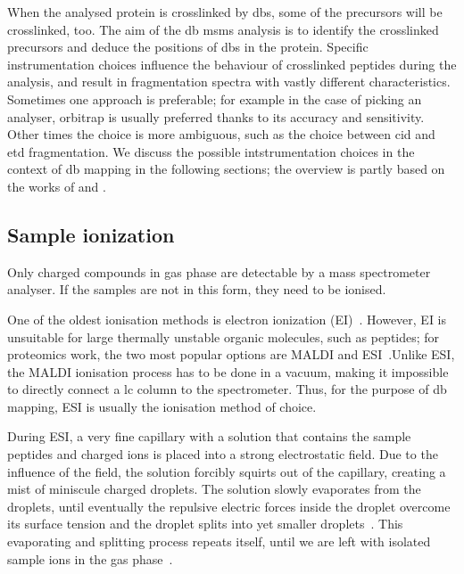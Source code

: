 When the analysed protein is crosslinked by \glspl*{db}, some of the precursors will be crosslinked, too. The aim of the \gls*{db} \gls*{msms} analysis is to identify the crosslinked precursors and deduce the positions of \glspl*{db} in the protein. Specific instrumentation choices influence the behaviour of crosslinked peptides during the analysis, and result in fragmentation spectra with vastly different characteristics. Sometimes one approach is preferable; for example in the case of picking an analyser, orbitrap is usually preferred thanks to its accuracy and sensitivity. Other times the choice is more ambiguous, such as the choice between \gls*{cid} and \gls*{etd} fragmentation. We discuss the possible intstrumentation choices in the context of \gls*{db} mapping in the following sections; the overview is partly based on the works of \citet{matthiesen2007mass} and \citet{gross2006mass}.

\subsection{Sample ionization}\label{sec:ionisation}

Only charged compounds in gas phase are detectable by a mass spectrometer analyser. If the samples are not in this form, they need to be ionised.

One of the oldest ionisation methods is electron ionization (EI)~\cite{field2013electron}. However, EI is unsuitable for large thermally unstable organic molecules, such as peptides; for proteomics work, the two most popular options are MALDI and ESI~\cite{caprioli1997molecular, fenn1990electrospray}.\@ Unlike ESI, the MALDI ionisation process has to be done in a vacuum, making it impossible to directly connect a \gls*{lc} column to the spectrometer. Thus, for the purpose of \gls*{db} mapping, ESI is usually the ionisation method of choice.

During ESI, a very fine capillary with a solution that contains the sample peptides and charged ions is placed into a strong electrostatic field. Due to the influence of the field, the solution forcibly squirts out of the capillary, creating a mist of miniscule charged droplets. The solution slowly evaporates from the droplets, until eventually the repulsive electric forces inside the droplet overcome its surface tension and the droplet splits into yet smaller droplets~\cite{rayleigh1882xx}. This evaporating and splitting process repeats itself, until we are left with isolated sample ions in the gas phase~\cite{dole1968molecular,dole1968gas,fenn1989electrospray, fenn1990electrospray}.

